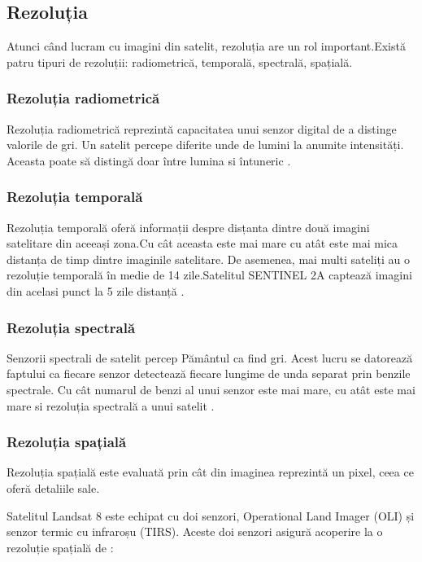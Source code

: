 \documentclass[12pt,a4paper]{article}
\theoremstyle{definition}
\theoremstyle{remark}
\begin{document}
\subsection{Rezoluția}
Atunci când lucram cu imagini din satelit, rezoluția are un rol important.Există patru tipuri de rezoluții: radiometrică, temporală, spectrală, spațială.

\subsubsection{Rezoluția radiometrică}

Rezoluția radiometrică reprezintă capacitatea unui senzor digital de a distinge valorile de gri.\cite{radiometrica} Un satelit percepe diferite unde de lumini la anumite intensități. Aceasta poate să distingă doar între lumina si întuneric \cite{radiometrica}.

\subsubsection{Rezoluția temporală}

Rezoluția temporală oferă informații despre disțanta dintre două imagini satelitare din aceeași zona.Cu cât aceasta este mai mare cu atât este mai mica distanța de timp dintre imaginile satelitare. De asemenea, mai multi sateliți au o rezoluție temporală în medie de 14 zile.Satelitul SENTINEL 2A captează imagini din acelasi punct la 5 zile distanță \cite{temporala}.

\subsubsection{Rezoluția spectrală}

Senzorii spectrali de satelit percep Pământul ca find gri. Acest lucru se datorează faptului ca fiecare senzor detectează fiecare lungime de unda separat prin benzile spectrale. Cu cât numarul de benzi al unui senzor este mai mare, cu atât este mai mare si rezoluția spectrală a unui satelit \cite{temporala}.
 
\subsubsection{Rezoluția spațială}

Rezoluția spațială  este evaluată prin cât din imaginea reprezintă un pixel, ceea ce oferă detaliile sale.

Satelitul Landsat 8 este echipat cu doi senzori, Operational Land Imager (OLI) și senzor termic cu infraroșu (TIRS)\cite{spatiala}. Aceste doi senzori asigură acoperire la o rezoluție spațială de \cite{spatiala}:
\end{document}
